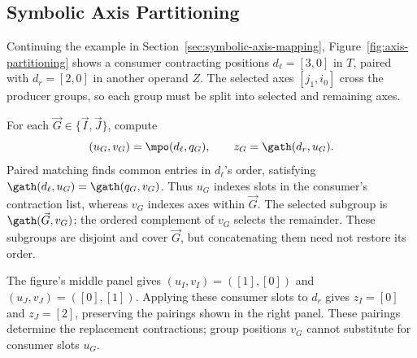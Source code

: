 \subsection{Symbolic Axis Partitioning}
\label{sec:symbolic-axis-partitioning}
Continuing the example in Section~\ref{sec:symbolic-axis-mapping},
Figure~\ref{fig:axis-partitioning} shows a consumer contracting positions $d_\ell=[3,0]$ in $T$, paired
with $d_r=[2,0]$ in another operand $Z$. The selected axes $[j_1,i_0]$
cross the producer groups, so each group must be split into selected and
remaining axes.


For each $\vec G\in\{\vec I,\vec J\}$, compute
\begin{equation}
 (u_G,v_G)=\mpo(d_\ell,q_G),\qquad z_G=\gath(d_r,u_G).
 \label{eq:symbolic-partition-selectors}
\end{equation}
Paired matching finds common entries in $d_\ell$'s order, satisfying
$\gath(d_\ell,u_G)=\gath(q_G,v_G)$. Thus $u_G$ indexes slots in the
consumer's contraction list, whereas $v_G$ indexes axes within $\vec G$.
The selected subgroup is $\gath(\vec G,v_G)$; the ordered complement of
$v_G$ selects the remainder. These subgroups are disjoint and cover $\vec G$,
but concatenating them need not restore its order.

The figure's middle panel gives $(u_I,v_I)=([1],[0])$ and
$(u_J,v_J)=([0],[1])$. Applying these consumer slots to $d_r$ gives
$z_I=[0]$ and $z_J=[2]$, preserving the pairings shown in the right panel.
These pairings determine the replacement contractions; group positions
$v_G$ cannot substitute for consumer slots $u_G$.

